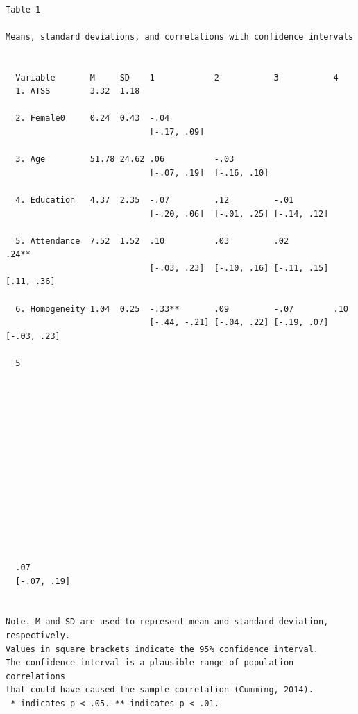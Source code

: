 \documentclass[
  english,
]{book}
\begin{document}
\begin{verbatim}

Table 1 

Means, standard deviations, and correlations with confidence intervals
 

  Variable       M     SD    1            2           3           4          
  1. ATSS        3.32  1.18                                                  
                                                                             
  2. Female0     0.24  0.43  -.04                                            
                             [-.17, .09]                                     
                                                                             
  3. Age         51.78 24.62 .06          -.03                               
                             [-.07, .19]  [-.16, .10]                        
                                                                             
  4. Education   4.37  2.35  -.07         .12         -.01                   
                             [-.20, .06]  [-.01, .25] [-.14, .12]            
                                                                             
  5. Attendance  7.52  1.52  .10          .03         .02         .24**      
                             [-.03, .23]  [-.10, .16] [-.11, .15] [.11, .36] 
                                                                             
  6. Homogeneity 1.04  0.25  -.33**       .09         -.07        .10        
                             [-.44, -.21] [-.04, .22] [-.19, .07] [-.03, .23]
                                                                             
  5          
             
             
             
             
             
             
             
             
             
             
             
             
             
             
  .07        
  [-.07, .19]
             

Note. M and SD are used to represent mean and standard deviation, respectively.
Values in square brackets indicate the 95% confidence interval.
The confidence interval is a plausible range of population correlations 
that could have caused the sample correlation (Cumming, 2014).
 * indicates p < .05. ** indicates p < .01.
 
\end{verbatim}
\end{document}
